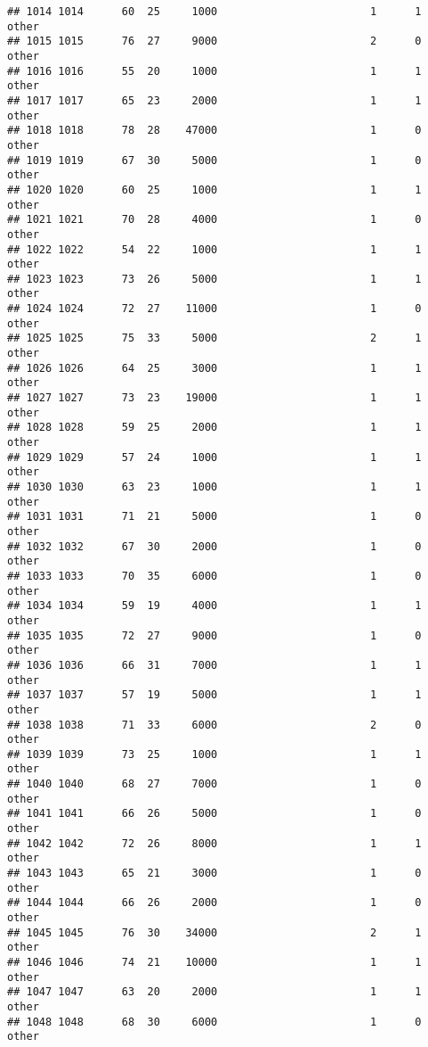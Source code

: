 \documentclass[
]{article}
\begin{document}
\begin{verbatim}
## 1014 1014      60  25     1000                        1      1    other
## 1015 1015      76  27     9000                        2      0    other
## 1016 1016      55  20     1000                        1      1    other
## 1017 1017      65  23     2000                        1      1    other
## 1018 1018      78  28    47000                        1      0    other
## 1019 1019      67  30     5000                        1      0    other
## 1020 1020      60  25     1000                        1      1    other
## 1021 1021      70  28     4000                        1      0    other
## 1022 1022      54  22     1000                        1      1    other
## 1023 1023      73  26     5000                        1      1    other
## 1024 1024      72  27    11000                        1      0    other
## 1025 1025      75  33     5000                        2      1    other
## 1026 1026      64  25     3000                        1      1    other
## 1027 1027      73  23    19000                        1      1    other
## 1028 1028      59  25     2000                        1      1    other
## 1029 1029      57  24     1000                        1      1    other
## 1030 1030      63  23     1000                        1      1    other
## 1031 1031      71  21     5000                        1      0    other
## 1032 1032      67  30     2000                        1      0    other
## 1033 1033      70  35     6000                        1      0    other
## 1034 1034      59  19     4000                        1      1    other
## 1035 1035      72  27     9000                        1      0    other
## 1036 1036      66  31     7000                        1      1    other
## 1037 1037      57  19     5000                        1      1    other
## 1038 1038      71  33     6000                        2      0    other
## 1039 1039      73  25     1000                        1      1    other
## 1040 1040      68  27     7000                        1      0    other
## 1041 1041      66  26     5000                        1      0    other
## 1042 1042      72  26     8000                        1      1    other
## 1043 1043      65  21     3000                        1      0    other
## 1044 1044      66  26     2000                        1      0    other
## 1045 1045      76  30    34000                        2      1    other
## 1046 1046      74  21    10000                        1      1    other
## 1047 1047      63  20     2000                        1      1    other
## 1048 1048      68  30     6000                        1      0    other

\end{verbatim}
\end{document}
